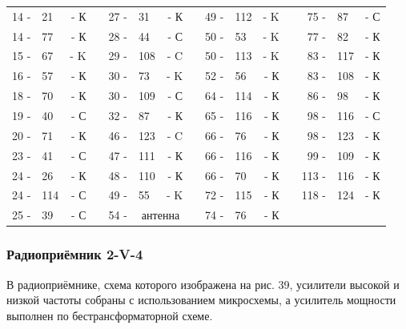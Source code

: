 \documentclass[12pt]{article}
\newcommand{\mc}{\multicolumn}
\begin{document}
\begin{tabular}{r l r p{0.5cm} r l r p{0.5cm} r l r p{0.5cm} r l r}
14 - & 21  & - К &     & 27 - & 31      &   - К    &      &  49 - & 112 & - K &     &  75 - &  87 & - С\\
14 - & 77  & - К &     & 28 - & 44      &   - С    &      &  50 - &  53 & - K &     &  77 - &  82 & - К\\
15 - & 67  & - K &     & 29 - & 108     &   - C    &      &  50 - & 113 & - K &     &  83 - & 117 & - К\\
16 - & 57  & - К &     & 30 - & 73      &   - K    &      &  52 - &  56 & - К &     &  83 - & 108 & - К\\
18 - & 70  & - К &     & 30 - & 109     &   - С    &      &  64 - & 114 & - К &     &  86 - &  98 & - К\\
19 - & 40  & - С &     & 32 - & 87      &   - К    &      &  65 - & 116 & - К &     &  98 - & 116 & - С\\
20 - & 71  & - К &     & 46 - & 123     &   - C    &      &  66 - &  76 & - К &     &  98 - & 123 & - К\\
23 - & 41  & - С &     & 47 - & 111     &   - К    &      &  66 - & 116 & - К &     &  99 - & 109 & - К\\
24 - & 26  & - К &     & 48 - & 110     &   - К    &      &  66 - &  70 & - К &     & 113 - & 116 & - К\\
24 - & 114 & - С &     & 49 - & 55      &   - K    &      &  72 - & 115 & - К &     & 118 - & 124 & - К\\
25 - & 39  & - С &     & 54 - & \mc{2}{c}{антенна} &      &  74 - &  76 & - К &     &       &     &    \\
\end{tabular}

\hrulefill

\vspace*{2cm}
\subsubsection{Радиоприёмник 2-V-4}
\vspace*{1cm}
В радиоприёмнике, схема которого изображена на рис. 39, усилители высокой и низкой частоты собраны с использованием микросхемы, а усилитель мощности выполнен по бестрансформаторной схеме.

    
\hrulefill
\end{document}
